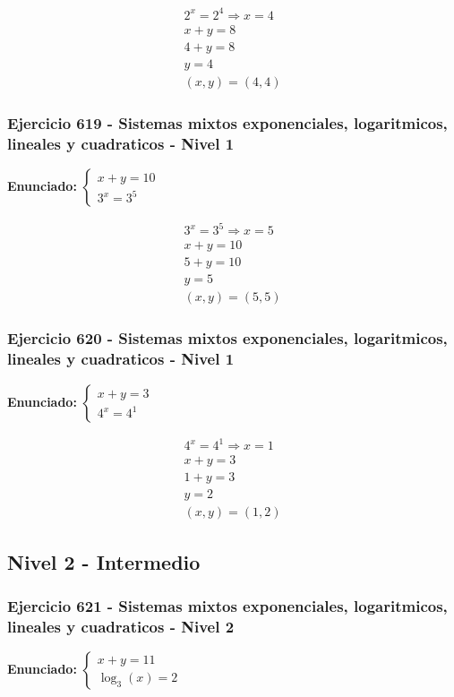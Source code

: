 \documentclass[12pt,a4paper]{article}
\begin{document}
\[
\begin{aligned}
2^x=2^{4}\Rightarrow x=4\\
x+y=8\\
4+y=8\\
y=4\\
\boxed{(x,y)=(4,4)}
\end{aligned}
\]


\subsubsection*{Ejercicio 619 - Sistemas mixtos exponenciales, logaritmicos, lineales y cuadraticos - Nivel 1}
\textbf{Enunciado:} \(\begin{cases} x+y=10\\ 3^x=3^{5}\end{cases}\)

\[
\begin{aligned}
3^x=3^{5}\Rightarrow x=5\\
x+y=10\\
5+y=10\\
y=5\\
\boxed{(x,y)=(5,5)}
\end{aligned}
\]


\subsubsection*{Ejercicio 620 - Sistemas mixtos exponenciales, logaritmicos, lineales y cuadraticos - Nivel 1}
\textbf{Enunciado:} \(\begin{cases} x+y=3\\ 4^x=4^{1}\end{cases}\)

\[
\begin{aligned}
4^x=4^{1}\Rightarrow x=1\\
x+y=3\\
1+y=3\\
y=2\\
\boxed{(x,y)=(1,2)}
\end{aligned}
\]


\newpage

\subsection*{Nivel 2 - Intermedio}

\subsubsection*{Ejercicio 621 - Sistemas mixtos exponenciales, logaritmicos, lineales y cuadraticos - Nivel 2}
\textbf{Enunciado:} \(\begin{cases} x+y=11\\ \log_{3}\left(x\right)=2\end{cases}\)
\end{document}
